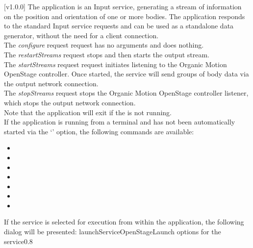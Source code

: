 [v1.0.0]
The  application is an Input service,
generating a stream of information on the position and orientation of one or more bodies.
The application responds to the standard Input service requests and can be used as a
standalone data generator, without the need for a client connection.\\

The \emph{configure} request request has no arguments and does nothing.\\

The \emph{restartStreams} request stops and then starts the output stream.\\

The \emph{startStreams} request request initiates listening to the Organic Motion
OpenStage controller.
Once started, the service will send groups of body data via the output \yarp{} network
connection.\\

The \emph{stopStreams} request stops the Organic Motion OpenStage controller listener,
which stops the output \yarp{} network connection.\\ 

Note that the application will exit if the \emph{\RS} is not running.
\insertAppParameters
\insertTagDescription{\NNI}
\insertInputServiceComment\\

If the application is running from a terminal and has not been automatically started via
the `' option, the following commands are available:
\begin{itemize}
\item{}
\item\exSp{}
\item\exSp{}
\item\exSp{}
\item\exSp{}
\item\exSp{}
\item\exSp{}
\end{itemize}
\secondaryEnd
\condPage
{}
If the service is selected for execution from within the \emph{\MMMU}
application, the following dialog will be presented:
%
{launchServiceOpenStage}{Launch options for the \emph{\OSI} service}{0.8}

